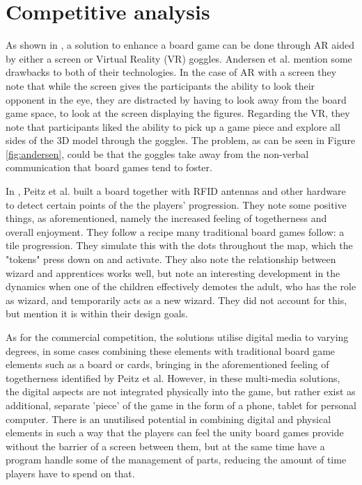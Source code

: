 \section{Competitive analysis}
As shown in \citep{andersen_designing_2004}, a solution to enhance a board game can be done through AR aided by either a screen or Virtual Reality (VR) goggles. Andersen et al. mention some drawbacks to both of their technologies. In the case of AR with a screen they note that while the screen gives the participants the ability to look their opponent in the eye, they are distracted by having to look away from the board game space, to look at the screen displaying the figures. Regarding the VR, they note that participants liked the ability to pick up a game piece and explore all sides of the 3D model through the goggles. The problem, as can be seen in Figure \ref{fig:andersen}, could be that the goggles take away from the non-verbal communication that board games tend to foster.

In \citep{peitzWizards2006}, Peitz et al. built a board together with RFID antennas and other hardware to detect certain points of the the players' progression. They note some positive things, as aforementioned, namely the increased feeling of togetherness and overall enjoyment. They follow a recipe many traditional board games follow: a tile progression. They simulate this with the dots throughout the map, which the "tokens" press down on and activate. They also note the relationship between wizard and apprentices works well, but note an interesting development in the dynamics when one of the children effectively demotes the adult, who has the role as wizard, and temporarily acts as a new wizard. They did not account for this, but mention it is within their design goals.

As for the commercial competition, the solutions utilise digital media to varying degrees, in some cases combining these elements with traditional board game elements such as a board or cards, bringing in the aforementioned feeling of togetherness identified by Peitz et al. However, in these multi-media solutions, the digital aspects are not integrated physically into the game, but rather exist as additional, separate 'piece' of the game in the form of a phone, tablet for personal computer. There is an unutilised potential in combining digital and physical elements in such a way that the players can feel the unity board games provide without the barrier of a screen between them, but at the same time have a program handle some of the management of parts, reducing the amount of time players have to spend on that.

